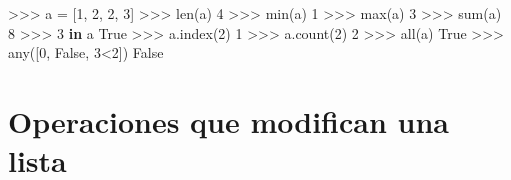 \documentclass[
  spanish,
  a4paper,
]{scrreport}
\newenvironment{Shaded}{\begin{snugshade}}{\end{snugshade}}
\newcommand{\BuiltInTok}[1]{\textcolor[rgb]{0.00,0.23,0.31}{#1}}
\newcommand{\DecValTok}[1]{\textcolor[rgb]{0.68,0.00,0.00}{#1}}
\newcommand{\KeywordTok}[1]{\textcolor[rgb]{0.00,0.23,0.31}{\textbf{#1}}}
\newcommand{\NormalTok}[1]{\textcolor[rgb]{0.00,0.23,0.31}{#1}}
\newcommand{\OperatorTok}[1]{\textcolor[rgb]{0.37,0.37,0.37}{#1}}
\newcommand{\VariableTok}[1]{\textcolor[rgb]{0.07,0.07,0.07}{#1}}
\begin{document}
\begin{Shaded}
\begin{Highlighting}[]
\OperatorTok{\textgreater{}\textgreater{}\textgreater{}}\NormalTok{ a }\OperatorTok{=}\NormalTok{ [}\DecValTok{1}\NormalTok{, }\DecValTok{2}\NormalTok{, }\DecValTok{2}\NormalTok{, }\DecValTok{3}\NormalTok{]}
\OperatorTok{\textgreater{}\textgreater{}\textgreater{}} \BuiltInTok{len}\NormalTok{(a)}
\DecValTok{4}
\OperatorTok{\textgreater{}\textgreater{}\textgreater{}} \BuiltInTok{min}\NormalTok{(a)}
\DecValTok{1}
\OperatorTok{\textgreater{}\textgreater{}\textgreater{}} \BuiltInTok{max}\NormalTok{(a)}
\DecValTok{3}
\OperatorTok{\textgreater{}\textgreater{}\textgreater{}} \BuiltInTok{sum}\NormalTok{(a)}
\DecValTok{8}
\OperatorTok{\textgreater{}\textgreater{}\textgreater{}} \DecValTok{3} \KeywordTok{in}\NormalTok{ a}
\VariableTok{True}
\OperatorTok{\textgreater{}\textgreater{}\textgreater{}}\NormalTok{ a.index(}\DecValTok{2}\NormalTok{)}
\DecValTok{1}
\OperatorTok{\textgreater{}\textgreater{}\textgreater{}}\NormalTok{ a.count(}\DecValTok{2}\NormalTok{)}
\DecValTok{2}
\OperatorTok{\textgreater{}\textgreater{}\textgreater{}} \BuiltInTok{all}\NormalTok{(a)}
\VariableTok{True}
\OperatorTok{\textgreater{}\textgreater{}\textgreater{}} \BuiltInTok{any}\NormalTok{([}\DecValTok{0}\NormalTok{, }\VariableTok{False}\NormalTok{, }\DecValTok{3}\OperatorTok{\textless{}}\DecValTok{2}\NormalTok{])}
\VariableTok{False}
\end{Highlighting}
\end{Shaded}

\section{Operaciones que modifican una
lista}\label{operaciones-que-modifican-una-lista}
\end{document}
